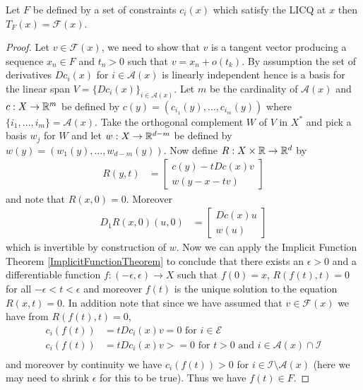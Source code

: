 \begin{prop}\label{LICQTangentRegularity}Let $F$ be defined by a set of constraints $c_i(x)$ which
  satisfy the LICQ at $x$ then $T_F(x) = \mathcal{F}(x)$.
\end{prop}
\begin{proof}
Let $v \in \mathcal{F}(x)$, we need to show that $v$ is a tangent
vector producing a sequence $x_n \in F$ and $t_n > 0$ such that $v = x_n + o(t_k)$. 
By assumption the set of derivatives $Dc_i(x)$ for $i \in
\mathcal{A}(x)$ is linearly independent hence is a basis for the linear 
span $V = \lbrace Dc_i(x) \rbrace_{i \in \mathcal{A}(x)}$.  Let $m$ be the cardinality of $\mathcal{A}(x)$ and $c : X \to \mathbb{R}^m$ 
be defined by $c(y) = (c_{i_1}(y), \dotsc, c_{i_m}(y))$ where $\lbrace i_1, \dotsc, i_m \rbrace = \mathcal{A}(x)$.
Take the orthogonal complement $W$ of $V$ 
in $X^*$ and pick a basis $w_j$ for $W$ and let $w : X \to \mathbb{R}^{d-m}$ be defined by $w(y) = (w_1(y), \dotsc, w_{d-m}(y))$.  Now define $R : X \times \mathbb{R} \to \mathbb{R}^d$ by
\begin{align*}
R(y,t) &= \begin{bmatrix}
c(y) - t Dc(x) v \\
w(y - x - tv)
\end{bmatrix}
\end{align*}
and note that $R(x,0) = 0$.  Moreover 
\begin{align*}
D_1R(x,0)(u, 0) &= \begin{bmatrix}
Dc(x) u \\
w(u)
\end{bmatrix}
\end{align*}
which is invertible by construction of $w$.  Now we can apply the Implicit Function Theorem \ref{ImplicitFunctionTheorem} to 
conclude that there exists an $\epsilon > 0$ and a differentiable function $f : (-\epsilon, \epsilon) \to X$ such that $f(0) = x$, $R(f(t), t) = 0$ 
for all $-\epsilon < t < \epsilon$ and moreover $f(t)$ is the unique solution to the equation $R(x,t) = 0$.  In addition note that
since we have assumed that $v \in \mathcal{F}(x)$ we have from $R(f(t), t) = 0$,
\begin{align*}
c_i(f(t)) &= t Dc_i(x) v = 0 \text{ for $i \in \mathcal{E}$} \\
c_i(f(t)) &= t Dc_i(x) v >= 0 \text{ for $t > 0$ and $i \in \mathcal{A}(x)\cap \mathcal{I}$} \\
\end{align*}
and moreover by continuity we have $c_i(f(t)) > 0$ for $i \in \mathcal{I} \setminus \mathcal{A}(x)$ (here we may need to shrink $\epsilon$ for this to be true).  Thus we have $f(t) \in F$.  


\end{proof}
